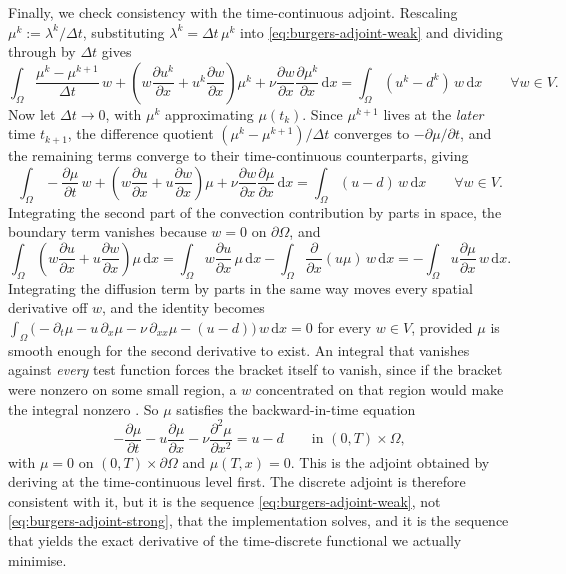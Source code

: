 \documentclass[a4paper,11pt]{article}
\newcommand{\Om}{\Omega}
\newcommand{\dom}{\partial\Omega}
\newcommand{\dx}{\,\mathrm{d}x}
\theoremstyle{spacedplain} \newtheorem{theorem}[counter]{Theorem} \newtheorem{lemma}[counter]{Lemma} \newtheorem{prop}[counter]{Proposition} \newtheorem{cor}[counter]{Corollary}
\theoremstyle{spaceddefinition} \newtheorem{defn}[counter]{Definition} \newtheorem{example}[counter]{Example} \newtheorem{remark}[counter]{Remark}
\begin{document}
Finally, we check consistency with the time-continuous adjoint. Rescaling $\mu^k := \lambda^k / \Delta t$, substituting $\lambda^k = \Delta t\, \mu^k$ into \cref{eq:burgers-adjoint-weak} and dividing through by $\Delta t$ gives
\begin{equation}
  \int_{\Om}
  \frac{\mu^k - \mu^{k+1}}{\Delta t}\, w
  + \left( w \frac{\partial u^k}{\partial x}
           + u^k \frac{\partial w}{\partial x} \right) \mu^k
  + \nu \frac{\partial w}{\partial x} \frac{\partial \mu^k}{\partial x}
  \dx
  = \int_{\Om} (u^k - d^k)\, w \dx
  \qquad \forall w \in V.
\end{equation}
Now let $\Delta t \to 0$, with $\mu^k$ approximating $\mu(t_k)$. Since $\mu^{k+1}$ lives at the \emph{later} time $t_{k+1}$, the difference quotient $(\mu^k - \mu^{k+1})/\Delta t$ converges to $-\partial \mu / \partial t$, and the remaining terms converge to their time-continuous counterparts, giving
\begin{equation}
  \int_{\Om}
  -\frac{\partial \mu}{\partial t}\, w
  + \left( w \frac{\partial u}{\partial x}
           + u \frac{\partial w}{\partial x} \right) \mu
  + \nu \frac{\partial w}{\partial x} \frac{\partial \mu}{\partial x}
  \dx
  = \int_{\Om} (u - d)\, w \dx
  \qquad \forall w \in V.
\end{equation}
Integrating the second part of the convection contribution by parts in space, the boundary term vanishes because $w = 0$ on $\dom$, and
\begin{equation}
  \int_{\Om} \left( w \frac{\partial u}{\partial x}
                    + u \frac{\partial w}{\partial x} \right) \mu \dx
  = \int_{\Om} w \frac{\partial u}{\partial x}\, \mu \dx
  - \int_{\Om} \frac{\partial}{\partial x}(u \mu)\, w \dx
  = -\int_{\Om} u \frac{\partial \mu}{\partial x}\, w \dx.
\end{equation}
Integrating the diffusion term by parts in the same way moves every spatial derivative off $w$, and the identity becomes $\int_{\Om} \bigl( -\partial_t \mu - u\, \partial_x \mu - \nu\, \partial_{xx} \mu - (u - d) \bigr)\, w \dx = 0$ for every $w \in V$, provided $\mu$ is smooth enough for the second derivative to exist. An integral that vanishes against \emph{every} test function forces the bracket itself to vanish, since if the bracket were nonzero on some small region, a $w$ concentrated on that region would make the integral nonzero \citep[Sect.~5.3]{hc2026}. So $\mu$ satisfies the backward-in-time equation
\begin{equation}
  \label{eq:burgers-adjoint-strong}
  -\frac{\partial \mu}{\partial t}
  - u \frac{\partial \mu}{\partial x}
  - \nu \frac{\partial^{2} \mu}{\partial x^{2}}
  = u - d
  \qquad \text{in } (0, T) \times \Om,
\end{equation}
with $\mu = 0$ on $(0, T) \times \dom$ and $\mu(T, x) = 0$. This is the adjoint obtained by deriving at the time-continuous level first. The discrete adjoint is therefore consistent with it, but it is the sequence \cref{eq:burgers-adjoint-weak}, not \cref{eq:burgers-adjoint-strong}, that the implementation solves, and it is the sequence that yields the exact derivative of the time-discrete functional we actually minimise.
\end{document}
